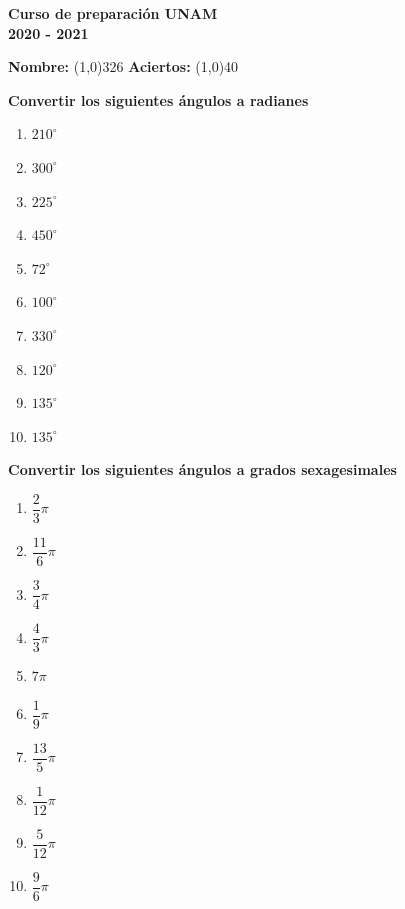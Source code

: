 \documentclass[12pt]{article}
\begin{document}
\begin{center}
  \textbf{ \Large{Curso de preparación UNAM} \\[2mm] 
  \large{2020 - 2021}}	
\end{center}

\begin{flushleft}	
  \textbf{Nombre: }
  \line(1,0){326}\;\;
  \textbf{Aciertos: }
  \line(1,0){40}\\  
\end{flushleft}	
\noindent
\textbf{Convertir los siguientes ángulos a radianes}
\begin{multicols*}{2}
  \begin{enumerate}[label=\Alph*.]
    \setlength\itemsep{3.5cm}
    \item $210^\circ$
    \item $300^\circ$
    \item $225^\circ$
    \item $450^\circ$
    \item $72^\circ$
    \item $100^\circ$
    \item $330^\circ$
    \item $120^\circ$
    \item $135^\circ$
    \item $135^\circ$
  \end{enumerate}
\end{multicols*}
\noindent
\textbf{Convertir los siguientes ángulos a grados sexagesimales}
\begin{multicols*}{2}
  \begin{enumerate}[label=\Alph*.]
    \setlength\itemsep{3.5cm}
    \item $\dfrac{2}{3}\pi$
    \item $\dfrac{11}{6}\pi$
    \item $\dfrac{3}{4}\pi$
    \item $\dfrac{4}{3}\pi$
    \item $7 \pi$
    \item $\dfrac{1}{9} \pi$
    \item $\dfrac{13}{5} \pi$
    \item $\dfrac{1}{12} \pi$
    \item $\dfrac{5}{12} \pi$
    \item $\dfrac{9}{6} \pi$
  \end{enumerate}
\end{multicols*}		
\end{document}
